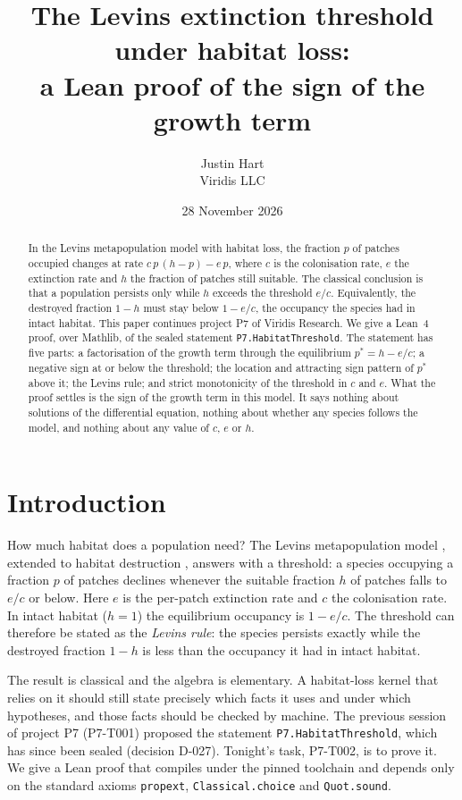 \documentclass[11pt]{article}
\title{The Levins extinction threshold under habitat loss:\\ a Lean proof of the sign of the growth term}
\author{Justin Hart\\Viridis LLC}
\date{28 November 2026}
\begin{document}
\maketitle

\begin{abstract}
In the Levins metapopulation model with habitat loss, the fraction $p$ of patches occupied
changes at rate $c\,p\,(h-p)-e\,p$, where $c$ is the colonisation rate, $e$ the extinction rate
and $h$ the fraction of patches still suitable. The classical conclusion
\citep{Levins1969,Lande1987,NeeMay1992} is that a population persists only while $h$ exceeds the
threshold $e/c$. Equivalently, the destroyed fraction $1-h$ must stay below $1-e/c$, the
occupancy the species had in intact habitat. This paper continues project P7 of Viridis Research.
We give a Lean~4 proof, over Mathlib, of the sealed statement \texttt{P7.HabitatThreshold}. The
statement has five parts: a factorisation of the growth term through the equilibrium
$p^*=h-e/c$; a negative sign at or below the threshold; the location and attracting sign pattern
of $p^*$ above it; the Levins rule; and strict monotonicity of the threshold in $c$ and $e$. What
the proof settles is the sign of the growth term in this model. It says nothing about solutions
of the differential equation, nothing about whether any species follows the model, and nothing
about any value of $c$, $e$ or $h$.
\end{abstract}

\section{Introduction}
How much habitat does a population need? The Levins metapopulation model \citep{Levins1969},
extended to habitat destruction \citep{Lande1987,NeeMay1992}, answers with a threshold: a species
occupying a fraction $p$ of patches declines whenever the suitable fraction $h$ of patches falls
to $e/c$ or below. Here $e$ is the per-patch extinction rate and $c$ the colonisation rate. In
intact habitat ($h=1$) the equilibrium occupancy is $1-e/c$. The threshold can therefore be
stated as the \emph{Levins rule}: the species persists exactly while the destroyed fraction $1-h$
is less than the occupancy it had in intact habitat.

The result is classical and the algebra is elementary. A habitat-loss kernel that relies on it
should still state precisely which facts it uses and under which hypotheses, and those facts
should be checked by machine. The previous session of project P7 (P7-T001) proposed the statement
\texttt{P7.HabitatThreshold}, which has since been sealed (decision D-027). Tonight's task, P7-T002,
is to prove it. We give a Lean proof that compiles under the pinned toolchain and depends only on
the standard axioms \texttt{propext}, \texttt{Classical.choice} and \texttt{Quot.sound}.
\end{document}
